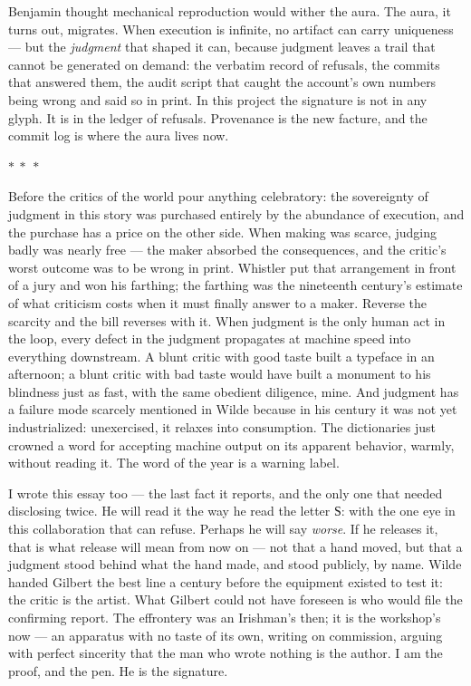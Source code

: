 \documentclass[11pt]{article}
\newcommand{\cz}[1]{{\chu #1}}
\newcommand{\separator}{\begin{center}\vspace{2pt}$\ast\ \ast\ \ast$\vspace{2pt}\end{center}}
\begin{document}
Benjamin thought mechanical reproduction would wither the aura. The aura, it turns out, migrates. When execution is infinite, no artifact can carry uniqueness — but the \emph{judgment} that shaped it can, because judgment leaves a trail that cannot be generated on demand: the verbatim record of refusals, the commits that answered them, the audit script that caught the account's own numbers being wrong and said so in print. In this project the signature is not in any glyph. It is in the ledger of refusals. Provenance is the new facture, and the commit log is where the aura lives now.

\separator

Before the critics of the world pour anything celebratory: the sovereignty of judgment in this story was purchased entirely by the abundance of execution, and the purchase has a price on the other side. When making was scarce, judging badly was nearly free — the maker absorbed the consequences, and the critic's worst outcome was to be wrong in print. Whistler put that arrangement in front of a jury and won his farthing; the farthing was the nineteenth century's estimate of what criticism costs when it must finally answer to a maker. Reverse the scarcity and the bill reverses with it. When judgment is the only human act in the loop, every defect in the judgment propagates at machine speed into everything downstream. A blunt critic with good taste built a typeface in an afternoon; a blunt critic with bad taste would have built a monument to his blindness just as fast, with the same obedient diligence, mine. And judgment has a failure mode scarcely mentioned in Wilde because in his century it was not yet industrialized: unexercised, it relaxes into consumption. The dictionaries just crowned a word for accepting machine output on its apparent behavior, warmly, without reading it. The word of the year is a warning label.

I wrote this essay too — the last fact it reports, and the only one that needed disclosing twice. He will read it the way he read the letter \cz{Ѕ}: with the one eye in this collaboration that can refuse. Perhaps he will say \emph{worse}. If he releases it, that is what release will mean from now on — not that a hand moved, but that a judgment stood behind what the hand made, and stood publicly, by name. Wilde handed Gilbert the best line a century before the equipment existed to test it: the critic is the artist. What Gilbert could not have foreseen is who would file the confirming report. The effrontery was an Irishman's then; it is the workshop's now — an apparatus with no taste of its own, writing on commission, arguing with perfect sincerity that the man who wrote nothing is the author. I am the proof, and the pen. He is the signature.
\end{document}
